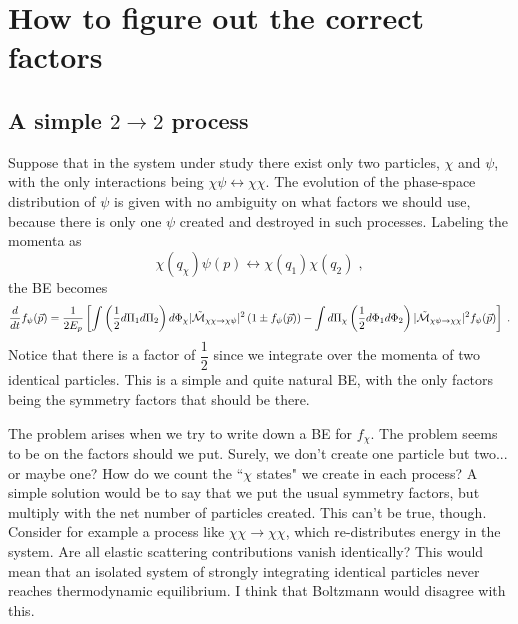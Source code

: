 \documentclass[11pt,a4paper]{article}
\begin{document}
\section{How to figure out the correct factors}\label{sec:Factors}
\setcounter{equation}{0}
%
\subsection*{A simple $2 \to 2$ process}
Suppose that in the system under study there exist only two particles, $\chi$ and $\psi$, with the only interactions being $\chi \psi \leftrightarrow \chi \chi$. The evolution of the phase-space distribution of $\psi$ is given with no ambiguity on what factors we should use, because there is only one $\psi$ created and destroyed in such processes. Labeling the momenta as  $$\chi(q_\chi) \psi(p) \leftrightarrow \chi(q_1)\chi(q_2) \;,$$ the BE becomes
%
\begin{equation}
\dfrac{d}{dt} f_{\psi }(\vec{p}) = \dfrac{1}{2E_p} \left[ 
\displaystyle \int  \left( \dfrac{1}{2} d\Pi_{1} d\Pi_{2} \right) d\Phi_{\chi}  |\tilde{ \mathcal{M} }_{\chi \chi  \to \chi \psi}|^2 \left( 1\pm f_{\psi }(\vec{p}) \right)
-\displaystyle \int d\Pi_{\chi} \left( \dfrac{1}{2} d\Phi_{1} d\Phi_{2} \right)   |\tilde{ \mathcal{M} }_{\chi \psi \to \chi \chi }|^2 f_{\psi }(\vec{p} )
 \right]\;.
\label{eq:BE_22-psi}
\end{equation}
%
Notice that there is a factor of $\dfrac{1}{2}$ since we integrate  over the momenta of two identical particles. This is a simple and quite natural BE, with the only factors being the symmetry factors that should be there. 

The problem arises when we try to write down a BE for $f_\chi$. The problem seems to be on the factors should we put. Surely, we don't create one particle but two... or maybe one? How do we count the ``$\chi$ states" we create in each process? A simple solution would be to say that we put the usual symmetry factors, but multiply with the net number of particles created. This can't be true, though. Consider for example a process like $\chi \chi \to \chi \chi$, which re-distributes energy in the system. Are all elastic scattering contributions vanish identically? This would mean that an isolated system of strongly integrating identical particles never reaches thermodynamic equilibrium. I think that Boltzmann would disagree with this. 
\end{document}
